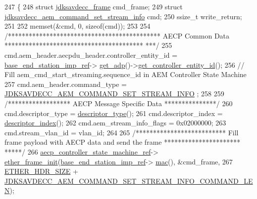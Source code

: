 \begin{DoxyCode}
247 \{
248     \textcolor{keyword}{struct }\hyperlink{structjdksavdecc__frame}{jdksavdecc\_frame} cmd\_frame;
249     \textcolor{keyword}{struct }\hyperlink{structjdksavdecc__aem__command__set__stream__info}{jdksavdecc\_aem\_command\_set\_stream\_info} cmd;
250     ssize\_t write\_return;
251 
252     memset(&cmd, 0, \textcolor{keyword}{sizeof}(cmd));
253 
254     \textcolor{comment}{/******************************************** AECP Common Data ****************************************
      ***/}
255     cmd.aem\_header.aecpdu\_header.controller\_entity\_id = \hyperlink{classavdecc__lib_1_1descriptor__base__imp_a550c969411f5f3b69f55cc139763d224}{base\_end\_station\_imp\_ref}->
      \hyperlink{classavdecc__lib_1_1end__station__imp_a471a74540ce6182fad0c17dfd010107e}{get\_adp}()->\hyperlink{classavdecc__lib_1_1adp_a0c0959a46658c0a22e9530334b2912da}{get\_controller\_entity\_id}();
256     \textcolor{comment}{// Fill aem\_cmd\_start\_streaming.sequence\_id in AEM Controller State Machine}
257     cmd.aem\_header.command\_type = \hyperlink{group__command_gab717d775edf0abc460068c111cd0ee3b}{JDKSAVDECC\_AEM\_COMMAND\_SET\_STREAM\_INFO}
      ;
258 
259     \textcolor{comment}{/****************** AECP Message Specific Data ***************/}
260     cmd.descriptor\_type = \hyperlink{classavdecc__lib_1_1descriptor__base__imp_aefc543029ab093823c3f5b9d84f0ccc4}{descriptor\_type}();
261     cmd.descriptor\_index = \hyperlink{classavdecc__lib_1_1descriptor__base__imp_ac23c0a35276c07cfce8c8660700c2135}{descriptor\_index}();
262     cmd.aem\_stream\_info\_flags = 0x02000000;
263     cmd.stream\_vlan\_id = vlan\_id;
264 
265     \textcolor{comment}{/************************** Fill frame payload with AECP data and send the frame **********************
      *****/}
266     \hyperlink{namespaceavdecc__lib_a0b1b5aea3c0490f77cbfd9178af5be22}{aecp\_controller\_state\_machine\_ref}->
      \hyperlink{classavdecc__lib_1_1aecp__controller__state__machine_a86ff947c5e6b799cfb877d3767bfa1f9}{ether\_frame\_init}(\hyperlink{classavdecc__lib_1_1descriptor__base__imp_a550c969411f5f3b69f55cc139763d224}{base\_end\_station\_imp\_ref}->
      \hyperlink{classavdecc__lib_1_1end__station__imp_a08e1bd1861b3b8f447ea374a65ac11f9}{mac}(), &cmd\_frame,
267                                                         \hyperlink{namespaceavdecc__lib_a6c827b1a0d973e18119c5e3da518e65ca9512ad9b34302ba7048d88197e0a2dc0}{ETHER\_HDR\_SIZE} + 
      \hyperlink{group__command__set__stream__info_ga07fbd87fc77d6b4b2bd0b4e05900729d}{JDKSAVDECC\_AEM\_COMMAND\_SET\_STREAM\_INFO\_COMMAND\_LEN});

\end{DoxyCode}
